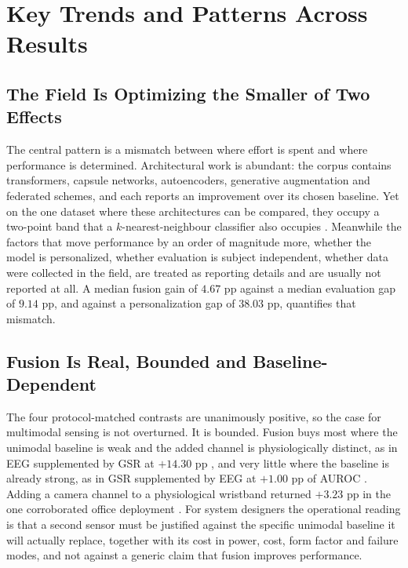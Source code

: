 \section{Key Trends and Patterns Across Results}

\subsection{The Field Is Optimizing the Smaller of Two Effects}
The central pattern is a mismatch between where effort is spent and where performance is
determined. Architectural work is abundant: the corpus contains transformers, capsule
networks, autoencoders, generative augmentation and federated schemes, and each reports an
improvement over its chosen baseline. Yet on the one dataset where these architectures can be
compared, they occupy a two-point band that a $k$-nearest-neighbour classifier also occupies
\cite{r14,r50}. Meanwhile the factors that move performance by an order of magnitude more,
whether the model is personalized, whether evaluation is subject independent, whether data
were collected in the field, are treated as reporting details and are usually not reported at
all. A median fusion gain of $4.67$ pp against a median evaluation gap of $9.14$ pp, and
against a personalization gap of $38.03$ pp, quantifies that mismatch.

\subsection{Fusion Is Real, Bounded and Baseline-Dependent}
The four protocol-matched contrasts are unanimously positive, so the case for multimodal
sensing is not overturned. It is bounded. Fusion buys most where the unimodal baseline is
weak and the added channel is physiologically distinct, as in EEG supplemented by GSR at
$+14.30$ pp \cite{r75}, and very little where the baseline is already strong, as in GSR
supplemented by EEG at $+1.00$ pp of AUROC \cite{r37}. Adding a camera channel to a
physiological wristband returned $+3.23$ pp in the one corroborated office deployment
\cite{r26}. For system designers the operational reading is that a second sensor must be
justified against the specific unimodal baseline it will actually replace, together with its
cost in power, cost, form factor and failure modes, and not against a generic claim that
fusion improves performance.

